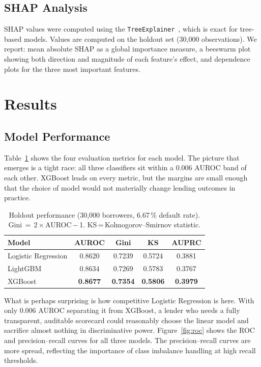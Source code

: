 \documentclass[11pt]{article}
\begin{document}
\subsection{SHAP Analysis}

SHAP values were computed using the \texttt{TreeExplainer}~\cite{lundberg2017shap},
which is exact for tree-based models. Values are computed on the holdout set
(30,000 observations). We report: mean absolute SHAP as a global importance measure,
a beeswarm plot showing both direction and magnitude of each feature's effect, and
dependence plots for the three most important features.

\section{Results}

\subsection{Model Performance}

Table~\ref{tab:results} shows the four evaluation metrics for each model.
The picture that emerges is a tight race: all three classifiers sit within a
0.006 AUROC band of each other. XGBoost leads on every metric,
but the margins are small enough that the choice of model would not
materially change lending outcomes in practice.

\begin{table}[h]
\centering
\caption{Holdout performance (30,000 borrowers, 6.67\,\% default rate).
Gini\,$=$\,$2\times$AUROC\,$-$\,1. KS\,=\,Kolmogorov--Smirnov statistic.}
\label{tab:results}
\begin{tabular}{lcccc}
\toprule
Model & AUROC & Gini & KS & AUPRC \\
\midrule
Logistic Regression & 0.8620 & 0.7239 & 0.5724 & 0.3881 \\
LightGBM            & 0.8634 & 0.7269 & 0.5783 & 0.3767 \\
XGBoost             & \textbf{0.8677} & \textbf{0.7354} & \textbf{0.5806} & \textbf{0.3979} \\
\bottomrule
\end{tabular}
\end{table}

What is perhaps surprising is how competitive Logistic Regression is here.
With only 0.006 AUROC separating it from XGBoost, a lender who needs a
fully transparent, auditable scorecard could reasonably choose the linear
model and sacrifice almost nothing in discriminative power.
Figure~\ref{fig:roc} shows the ROC and precision--recall curves for all three models.
The precision--recall curves are more spread, reflecting the importance of
class imbalance handling at high recall thresholds.
\end{document}
